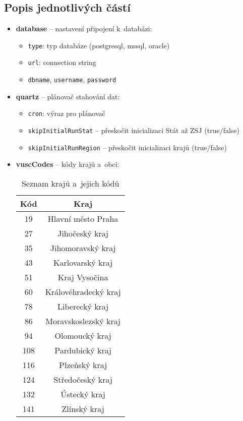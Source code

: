 \subsection*{Popis jednotlivých částí}
\begin{itemize}
  \item \textbf{database} -- nastavení připojení k~databázi:
  \begin{itemize}
    \item \texttt{type}: typ databáze (postgresql, mssql, oracle)
    \item \texttt{url}: connection string
    \item \texttt{dbname}, \texttt{username}, \texttt{password}
  \end{itemize}

  \item \textbf{quartz} -- plánovač stahování dat:
  \begin{itemize}
    \item \texttt{cron}: výraz pro plánovač
    \item \texttt{skipInitialRunStat} -- přeskočit inicializaci Stát až ZSJ (true/false)
    \item \texttt{skipInitialRunRegion} -- přeskočit inicializaci krajů (true/false)
  \end{itemize}

  \item \textbf{vuscCodes} -- kódy krajů a~obcí:
  \begin{longtable}{|c|c|}
    \caption{Seznam krajů a~jejich kódů} \\
    \hline
    \textbf{Kód} & \textbf{Kraj} \\
    \hline
    19 & Hlavní město Praha \\
    27 & Jihočeský kraj \\
    35 & Jihomoravský kraj \\
    43 & Karlovarský kraj \\
    51 & Kraj Vysočina \\
    60 & Královéhradecký kraj \\
    78 & Liberecký kraj \\
    86 & Moravskoslezský kraj \\
    94 & Olomoucký kraj \\
    108 & Pardubický kraj \\
    116 & Plzeňský kraj \\
    124 & Středočeský kraj \\
    132 & Ústecký kraj \\
    141 & Zlínský kraj \\
    \hline
  \end{longtable}


\end{itemize}

